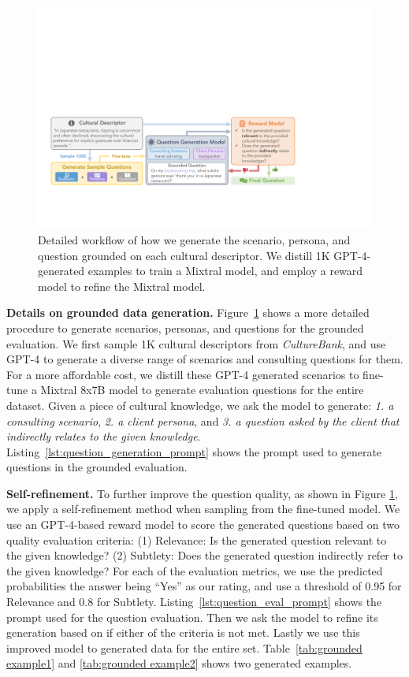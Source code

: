 \documentclass{article} %
\newcommand{\yutong}[1]{\textcolor{orange}{[#1 --Yutong]}}
\newcommand{\dataname}{\textit{CultureBank}\xspace}
\begin{document}
\begin{figure}[H]
\centering
\includegraphics[scale=0.4]{img/eval.pdf}
\caption{Detailed workflow of how we generate the scenario, persona, and question grounded on each cultural descriptor. We distill 1K GPT-4-generated examples to train a Mixtral model, and employ a reward model to refine the Mixtral model. %
}
\label{fig:grounded evaluation}
\end{figure}

\noindent\textbf{Details on grounded data generation. }Figure~\ref{fig:grounded evaluation} shows a more detailed procedure to generate scenarios, personas, and questions for the grounded evaluation. We first sample 1K cultural descriptors from \dataname, and use GPT-4 to generate a diverse range of scenarios and consulting questions for them. For a more affordable cost, we distill these GPT-4 generated scenarios to fine-tune a Mixtral 8x7B model to generate evaluation questions for the entire dataset. Given a piece of cultural knowledge, we ask the model to generate: \textit{1. a consulting scenario}, \textit{2. a client persona}, and \textit{3. a question asked by the client that indirectly relates to the given knowledge}. Listing~\ref{lst:question_generation_prompt} shows the prompt used to generate questions in the grounded evaluation.

\noindent\textbf{Self-refinement.} To further improve the question quality, as shown in Figure \ref{fig:grounded evaluation}, we apply a self-refinement method when sampling from the fine-tuned model. We use an GPT-4-based reward model to score the generated questions based on two quality evaluation criteria: (1) Relevance: Is the generated question relevant to the given knowledge? (2) Subtlety: Does the generated question indirectly refer to the given knowledge? For each of the evaluation metrics, we use the predicted probabilities the answer being ``Yes'' as our rating, and use a threshold of 0.95 for Relevance and 0.8 for Subtlety. Listing~\ref{lst:question_eval_prompt} shows the prompt used for the question evaluation. Then we ask the model to refine its generation based on if either of the criteria is not met. Lastly we use this improved model to generated data for the entire set. Table~\ref{tab:grounded example1} and \ref{tab:grounded example2} shows two generated examples. 
\end{document}
